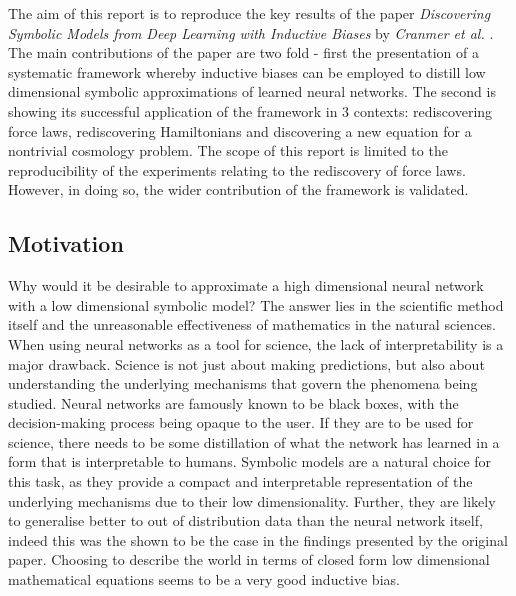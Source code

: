 \documentclass[11pt]{article}
\begin{document}





The aim of this report is to reproduce the key results of the paper \textit{Discovering Symbolic Models from Deep Learning with Inductive Biases} by \textit{Cranmer et al.} \cite{cranmer2020discoveringsymbolicmodelsdeep}. The main contributions of the paper are two fold - first the presentation of a systematic framework whereby inductive biases can be employed to distill low dimensional symbolic approximations of learned neural networks. The second is showing its successful application of the framework in 3 contexts: rediscovering force laws, rediscovering Hamiltonians and discovering a new equation for a nontrivial cosmology problem.
The scope of this report is limited to the reproducibility of the experiments relating to the rediscovery of force laws. However, in doing so, the wider contribution of the framework is validated.
\subsection{Motivation}
Why would it be desirable to approximate a high dimensional neural network with a low dimensional symbolic model? The answer lies in the scientific method itself and the unreasonable effectiveness of mathematics in the natural sciences. When using neural networks as a tool for science, the lack of interpretability is a major drawback. Science is not just about making predictions, but also about understanding the underlying mechanisms that govern the phenomena being studied. Neural networks are famously known to be black boxes, with the decision-making process being opaque to the user. If they are to be used for science, there needs to be some distillation of what the network has learned in a form that is interpretable to humans.  Symbolic models are a natural choice for this task, as they provide a compact and interpretable representation of the underlying mechanisms due to their low dimensionality. Further, they are likely to generalise better to out of distribution data than the neural network itself, indeed this was the shown to be the case in the findings presented by the original paper. Choosing to describe the world in terms of closed form low dimensional mathematical equations seems to be a very good inductive bias.
\end{document}
